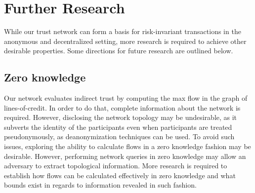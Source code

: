 \documentclass[11pt]{article}
\theoremstyle{definition}
\theoremstyle{corollary}
\theoremstyle{lemma}
\begin{document}
  \section{Further Research}

  While our trust network can form a basis for risk-invariant transactions in
  the anonymous and decentralized setting, more research is required to achieve
  other desirable properties. Some directions for future research are outlined
  below.

  \subsection{Zero knowledge}

  Our network evaluates indirect trust by computing the max flow in the graph
  of lines-of-credit. In order to do that, complete information about the
  network is required. However, disclosing the network topology may be
  undesirable, as it subverts the identity of the participants even when
  participants are treated pseudonymously, as deanonymization techniques can be
  used. To avoid such issues, exploring the ability to calculate flows in a
  zero knowledge fashion may be desirable. However, performing network queries
  in zero knowledge may allow an adversary to extract topological information.
  More research is required to establish how flows can be calculated
  effectively in zero knowledge and what bounds exist in regards to information
  revealed in such fashion.
\end{document}
